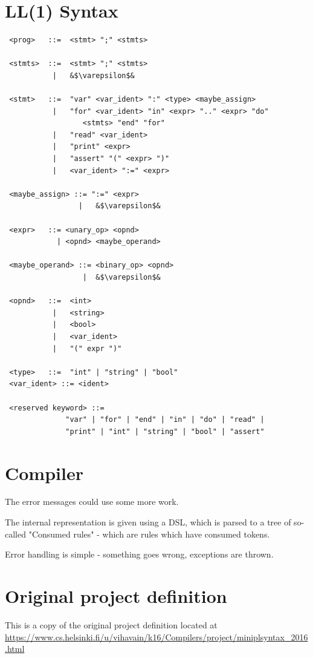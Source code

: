 \documentclass{article}
\begin{document}
\section{LL(1) Syntax}

\begin{verbatim}
 <prog>   ::=  <stmt> ";" <stmts>

 <stmts>  ::=  <stmt> ";" <stmts>
           |   &$\varepsilon$&

 <stmt>   ::=  "var" <var_ident> ":" <type> <maybe_assign>
           |   "for" <var_ident> "in" <expr> ".." <expr> "do"
                  <stmts> "end" "for"
           |   "read" <var_ident>
           |   "print" <expr>
           |   "assert" "(" <expr> ")"
           |   <var_ident> ":=" <expr>

 <maybe_assign> ::= ":=" <expr>
                 |   &$\varepsilon$&

 <expr>   ::= <unary_op> <opnd>
            | <opnd> <maybe_operand>

 <maybe_operand> ::= <binary_op> <opnd>
                  |  &$\varepsilon$&

 <opnd>   ::=  <int>
           |   <string>
           |   <bool>
           |   <var_ident>
           |   "(" expr ")"

 <type>   ::=  "int" | "string" | "bool"
 <var_ident> ::= <ident>

 <reserved keyword> ::=
              "var" | "for" | "end" | "in" | "do" | "read" |
              "print" | "int" | "string" | "bool" | "assert"
\end{verbatim}

\section{Compiler}
The error messages could use some more work.

The internal representation is given using a DSL, which is parsed to a tree of
so-called "Consumed rules" - which are rules which have consumed tokens.

Error handling is simple - something goes wrong, exceptions are thrown.

\section{Original project definition}

This is a copy of the original project definition located at
\url{https://www.cs.helsinki.fi/u/vihavain/k16/Compilers/project/miniplsyntax\_2016.html}
\end{document}

